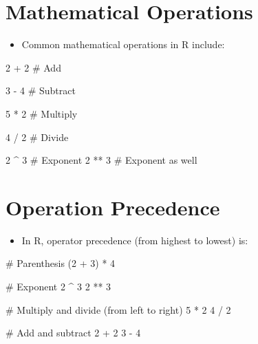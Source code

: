 \documentclass[
  letterpaper,
  DIV=11,
  numbers=noendperiod]{scrreprt}
\newenvironment{Shaded}{\begin{snugshade}}{\end{snugshade}}
\newcommand{\CommentTok}[1]{\textcolor[rgb]{0.37,0.37,0.37}{#1}}
\newcommand{\DecValTok}[1]{\textcolor[rgb]{0.68,0.00,0.00}{#1}}
\newcommand{\NormalTok}[1]{\textcolor[rgb]{0.00,0.23,0.31}{#1}}
\newcommand{\SpecialCharTok}[1]{\textcolor[rgb]{0.37,0.37,0.37}{#1}}
\providecommand{\tightlist}{%
  \setlength{\itemsep}{0pt}\setlength{\parskip}{0pt}}\usepackage{longtable,booktabs,array}
\begin{document}
\section{Mathematical Operations}\label{mathematical-operations}

\begin{itemize}
\tightlist
\item
  Common mathematical operations in R include:
\end{itemize}

\begin{Shaded}
\begin{Highlighting}[]
\DecValTok{2} \SpecialCharTok{+} \DecValTok{2}     \CommentTok{\# Add}

\DecValTok{3} \SpecialCharTok{{-}} \DecValTok{4}     \CommentTok{\# Subtract}

\DecValTok{5} \SpecialCharTok{*} \DecValTok{2}     \CommentTok{\# Multiply}

\DecValTok{4} \SpecialCharTok{/} \DecValTok{2}     \CommentTok{\# Divide}

\DecValTok{2} \SpecialCharTok{\^{}} \DecValTok{3}     \CommentTok{\# Exponent}
\DecValTok{2} \SpecialCharTok{**} \DecValTok{3}    \CommentTok{\# Exponent as well}
\end{Highlighting}
\end{Shaded}

\section{Operation Precedence}\label{operation-precedence}

\begin{itemize}
\tightlist
\item
  In R, operator precedence (from highest to lowest) is:
\end{itemize}

\begin{Shaded}
\begin{Highlighting}[]
\CommentTok{\# Parenthesis}
\NormalTok{(}\DecValTok{2} \SpecialCharTok{+} \DecValTok{3}\NormalTok{) }\SpecialCharTok{*} \DecValTok{4}

\CommentTok{\# Exponent}
\DecValTok{2} \SpecialCharTok{\^{}} \DecValTok{3}
\DecValTok{2} \SpecialCharTok{**} \DecValTok{3}

\CommentTok{\# Multiply and divide (from left to right)}
\DecValTok{5} \SpecialCharTok{*} \DecValTok{2}
\DecValTok{4} \SpecialCharTok{/} \DecValTok{2}

\CommentTok{\# Add and subtract}
\DecValTok{2} \SpecialCharTok{+} \DecValTok{2}
\DecValTok{3} \SpecialCharTok{{-}} \DecValTok{4}
\end{Highlighting}
\end{Shaded}
\end{document}
